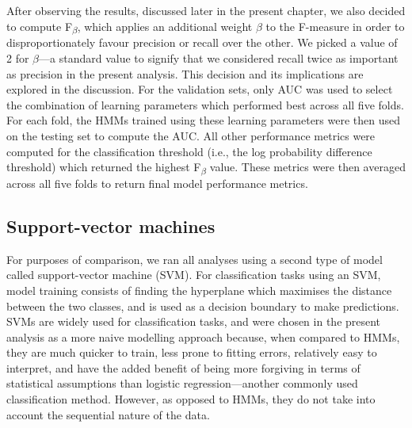 After observing the results, discussed later in the present chapter, we also decided to compute F\textsubscript{$\beta$}, which applies an additional weight $\beta$ to the F-measure in order to disproportionately favour precision or recall over the other. We picked a value of 2 for $\beta$---a standard value to signify that we considered recall twice as important as precision in the present analysis. This decision and its implications are explored in the discussion. For the validation sets, only AUC was used to select the combination of learning parameters which performed best across all five folds. For each fold, the HMMs trained using these learning parameters were then used on the testing set to compute the AUC. All other performance metrics were computed for the classification threshold (i.e., the log probability difference threshold) which returned the highest F\textsubscript{$\beta$} value. These metrics were then averaged across all five folds to return final model performance metrics.

\subsection{Support-vector machines}

For purposes of comparison, we ran all analyses using a second type of model called support-vector machine (SVM). For classification tasks using an SVM, model training consists of finding the hyperplane which maximises the distance between the two classes, and is used as a decision boundary to make predictions. SVMs are widely used for classification tasks, and were chosen in the present analysis as a more naive modelling approach because, when compared to HMMs, they are much quicker to train, less prone to fitting errors, relatively easy to interpret, and have the added benefit of being more forgiving in terms of statistical assumptions than logistic regression---another commonly used classification method. However, as opposed to HMMs, they do not take into account the sequential nature of the data.

